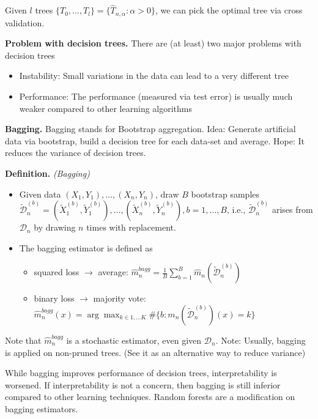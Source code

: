 \documentclass[
]{book}
\providecommand{\tightlist}{%
  \setlength{\itemsep}{0pt}\setlength{\parskip}{0pt}}
\begin{document}
Given \(l\) trees \(\{T_0,\dots, T_l\}=\{\hat T_{n,\alpha} : \alpha>0\}\), we can pick the optimal tree via cross validation.

\textbf{Problem with decision trees.} There are (at least) two major problems with decision trees

\begin{itemize}
\tightlist
\item
  Instability: Small variations in the data can lead to a very different tree
\item
  Performance: The performance (measured via test error) is usually much weaker compared to other learning algorithms
\end{itemize}

\textbf{Bagging.} Bagging stands for Bootstrap aggregation. Idea: Generate artificial data via bootstrap, build a decision tree for each data-set and average. Hope: It reduces the variance of decision trees.

\textbf{Definition.} \emph{(Bagging)}

\begin{itemize}
\tightlist
\item
  Given data \({(X_1,Y_1),\dots, (X_n,Y_n)}\), draw \(B\) bootstrap samples \(\tilde {\mathcal D}^{(b)}_n={(\tilde X^{(b)}_1,\tilde Y^{(b)}_1),\dots, (\tilde X^{(b)}_n,\tilde Y^{(b)}_n)}, b=1,\dots, B\), i.e., \(\tilde {\mathcal D}^{(b)}_n\) arises from \(\mathcal D_n\) by drawing \(n\) times with replacement.
\item
  The bagging estimator is defined as

  \begin{itemize}
  \tightlist
  \item
    squared loss \(\rightarrow\) average: \(\hat m^{bagg}_n=\frac 1 B \sum_{b=1}^B \hat m_n(\tilde {\mathcal D}^{(b)}_n)\)
  \item
    binary loss \(\rightarrow\) majority vote: \(\hat m^{bagg}_n(x)=\arg \max_{k\in {1,\dots K}} \#\{b: m_n(\tilde {\mathcal D}^{(b)}_n) (x)=k\}\)
  \end{itemize}
\end{itemize}

Note that \(\hat m^{bagg}_n\) is a stochastic estimator, even given \(\mathcal D_n\). Note: Usually, bagging is applied on non-pruned trees. (See it as an alternative way to reduce variance)

While bagging improves performance of decision trees, interpretability is worsened. If interpretability is not a concern, then bagging is still inferior compared to other learning techniques. Random forests are a modification on bagging estimators.
\end{document}
